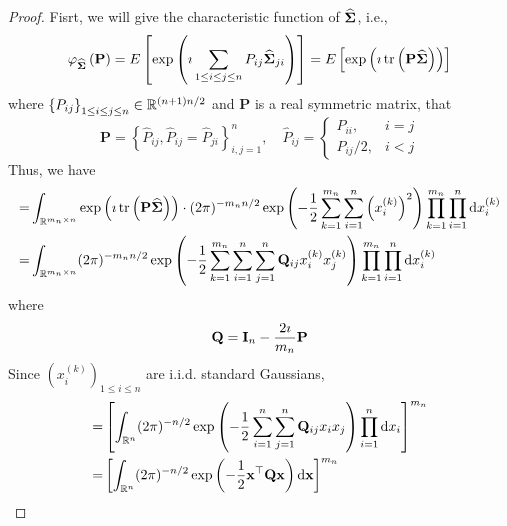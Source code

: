 \begin{proof}
	Fisrt, we will give the characteristic function of $\widehat{\boldsymbol{\Sigma}}$, i.e.,
	\begin{equation*}
		\varphi_{\widehat{\boldsymbol{\Sigma}}}\left(\mathbf{P}\right)=E\left[\exp\left(\imath\sum_{1\leq i\leq j\leq n}P_{ij}\widehat{\boldsymbol{\Sigma}}_{ji}\right)\right]=E\left[\exp\left(\imath\operatorname{tr}\left(\mathbf{P}\widehat{\boldsymbol{\Sigma}}\right)\right)\right]
	\end{equation*}
	where $\left\{P_{ij}\right\}_{1\leq i\leq j\leq n}\in{\mathbb R}^{(n+1)n/2}$ and $\mathbf{P}$ is a real symmetric matrix, that
	\begin{equation*}
		\mathbf{P}=\left\{\widehat{P}_{ij},\widehat{P}_{ij}=\widehat{P}_{ji}\right\}_{i,j=1}^{n},\quad\widehat{P}_{ij}=\begin{cases}P_{ii}, & i=j \\ P_{ij} / 2, & i<j \end{cases}
	\end{equation*}
	Thus, we have
	\begin{equation*}
		\begin{aligned}
			= & \int_{{\mathbb R}^{m_{n}\times n}}\exp\left(\imath\operatorname{tr}\left(\mathbf{P}\widehat{\boldsymbol{\Sigma}}\right)\right)\cdot(2\pi)^{-m_{n}n/2}\exp\left(-\frac{1}{2}\sum_{k=1}^{m_{n}}\sum_{i=1}^{n}\left(x_{i}^{(k)}\right)^{2}\right)\prod_{k=1}^{m_{n}}\prod_{i=1}^{n}\mathop{}\!\mathrm{d} x_{i}^{(k)} \\
			= & \int_{{\mathbb R}^{m_{n}\times n}}(2\pi)^{-m_{n}n/2}\exp\left(-\frac{1}{2}\sum_{k=1}^{m_{n}}\sum_{i=1}^{n}\sum_{j=1}^{n}{\bf Q}_{ij}x_{i}^{(k)}x_{j}^{(k)}\right)\prod_{k=1}^{m_{n}}\prod_{i=1}^{n}\mathop{}\!\mathrm{d} x_{i}^{(k)}
		\end{aligned}
	\end{equation*}
	where
	\begin{equation*}
		{\bf Q}=\mathbf{I}_{n}-\frac{2\imath}{m_{n}}\mathbf{P}
	\end{equation*}
	Since $\left(x_{i}^{(k)}\right)_{1\leq i\leq n}$ are i.i.d. standard Gaussians,
	\begin{equation*}
		\begin{aligned}
			= & \left[\int_{\bbR^{n}}(2\pi)^{-n/2}\exp\left(-\frac{1}{2}\sum_{i=1}^{n}\sum_{j=1}^{n}\bfQ_{ij}x_{i}x_{j}\right)\prod_{i=1}^{n}\dif x_{i}\right]^{m_{n}}                                                                                    \\
			= & \left[\int_{\bbR^{n}}(2\pi)^{-n/2}\exp\left(-\frac{1}{2}\bfx^{\top}\bfQ\bfx\right)\dif\bfx\right]^{m_{n}}                                                                                                                                 \\

\end{aligned}
\end{equation*}
\end{proof}
